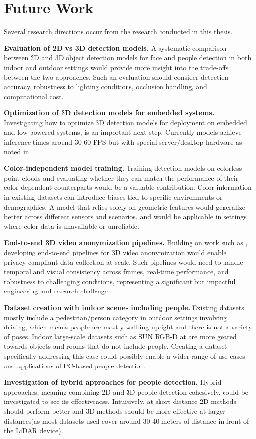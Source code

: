 \section{Future Work}

Several research directions occur from the research conducted in this thesis.

\textbf{Evaluation of 2D vs 3D detection models.}
A systematic comparison between 2D and 3D object detection models for face and people
detection in both indoor and outdoor settings would provide more insight into the
trade-offs between the two approaches. Such an evaluation should consider detection
accuracy, robustness to lighting conditions, occlusion handling, and computational cost.

\textbf{Optimization of 3D detection models for embedded systems.}
Investigating how to optimize 3D detection models for deployment on embedded
and low-powered systems, is an important next step. Currently models achieve
inference times around 30-60 FPS but with special server/desktop hardware
as noted in \cite{zimmer_survey_2022}.

\textbf{Color-independent model training.}
Training detection models on colorless point clouds and evaluating whether they
can match the performance of their color-dependent counterparts would be a valuable
contribution. Color information in existing datasets can introduce biases tied to
specific environments or demographics. A model that relies solely on geometric
features would generalize better across different sensors and scenarios, and would
be applicable in settings where color data is unavailable or unreliable.

\textbf{End-to-end 3D video anonymization pipelines.}
Building on work such as \cite{Zhao_Zhang_Demiris_2024}, developing end-to-end
pipelines for 3D video anonymization would enable privacy-compliant data collection
at scale. Such pipelines would need to handle temporal and visual consistency across frames,
real-time performance, and robustness to challenging conditions, representing a
significant but impactful engineering and research challenge.

\textbf{Dataset creation with indoor scenes including people.}
Existing datasets mostly include a pedestrian/person category in outdoor settings involving driving, which means people are mostly walking upright and there is not a variety of poses.
Indoor large-scale datasets such as SUN RGB-D at \cite{Song_Lichtenberg_Xiao_2015} are more geared towards objects and rooms that do not include people.
Creating a dataset specifically addressing this case could possibly enable a wider range of use cases and applications of \ac{PC}-based people detection.

\textbf{Investigation of hybrid approaches for people detection.}
Hybrid approaches, meaning combining 2D and 3D people detection cohesively, could be investigated to see its effectiveness.
Intuitively, at short distance 2D methods should perform better and 3D methods should be more effective at larger distances(as most datasets used cover around 30-40 meters of distance in front of the LiDAR device).


